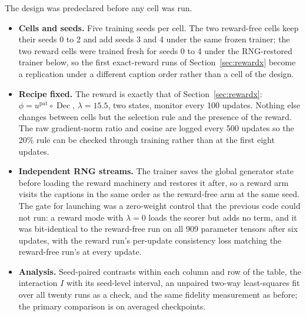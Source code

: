 \documentclass[11pt,a4paper]{article}
\DeclareMathOperator{\Dec}{Dec}
\begin{document}
The design was predeclared before any cell was run.
\begin{itemize}
\item \textbf{Cells and seeds.} Five training seeds per cell. The two reward-free cells keep their seeds 0 to 2 and add seeds 3 and 4 under the same frozen trainer; the two reward cells were trained fresh for seeds 0 to 4 under the RNG-restored trainer below, so the first exact-reward runs of Section~\ref{sec:rewardx} become a replication under a different caption order rather than a cell of the design.
\item \textbf{Recipe fixed.} The reward is exactly that of Section~\ref{sec:rewardx}: $\phi=u^{\mathrm{pat}}\circ\Dec$, $\lambda=15.5$, two states, monitor every 100 updates. Nothing else changes between cells but the selection rule and the presence of the reward. The raw gradient-norm ratio and cosine are logged every 500 updates so the 20\% rule can be checked through training rather than at the first eight updates.
\item \textbf{Independent RNG streams.} The trainer saves the global generator state before loading the reward machinery and restores it after, so a reward arm visits the captions in the same order as the reward-free arm at the same seed. The gate for launching was a zero-weight control that the previous code could not run: a reward mode with $\lambda=0$ loads the scorer but adds no term, and it was bit-identical to the reward-free run on all 909 parameter tensors after six updates, with the reward run's per-update consistency loss matching the reward-free run's at every update.
\item \textbf{Analysis.} Seed-paired contrasts within each column and row of the table, the interaction $I$ with its seed-level interval, an unpaired two-way least-squares fit over all twenty runs as a check, and the same fidelity measurement as before; the primary comparison is on averaged checkpoints.
\end{itemize}
\end{document}
